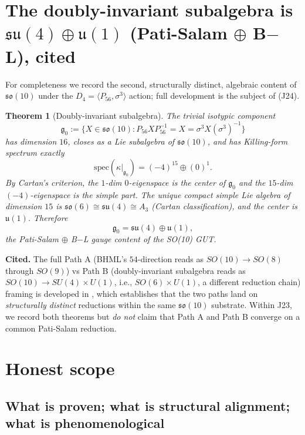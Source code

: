 \documentclass[11pt,reqno]{amsart}
\newtheorem{theorem}{Theorem}[section]
\theoremstyle{definition}
\newcommand{\so}{\mathfrak{so}}
\newcommand{\su}{\mathfrak{su}}
\newcommand{\uone}{\mathfrak{u}}
\newcommand{\Psix}{P_{56}}
\begin{document}
\section{The doubly-invariant subalgebra is $\su(4) \oplus \uone(1)$
(Pati-Salam $\oplus$ B$-$L), cited}
\label{sec:doubly-invariant}

For completeness we record the second, structurally distinct,
algebraic content of $\so(10)$ under the $D_4 = \langle \Psix,
\sigma^3 \rangle$ action; full development is the subject of
\cite{Sanders2026PathAPathB} (J24).

\begin{theorem}[Doubly-invariant subalgebra]
\label{thm:doubly-invariant}
The trivial isotypic component
\[
  \mathfrak{g}_0 := \{X \in \so(10) : \Psix X \Psix^{-1} = X
  = \sigma^3 X (\sigma^3)^{-1}\}
\]
has dimension $16$, closes as a Lie subalgebra of $\so(10)$, and
has Killing-form spectrum exactly
\[
  \mathrm{spec}(\kappa\big|_{\mathfrak{g}_0})
  = (-4)^{15} \oplus (0)^1.
\]
By Cartan's criterion, the $1$-dim $0$-eigenspace is the center of
$\mathfrak{g}_0$ and the $15$-dim $(-4)$-eigenspace is the simple
part. The unique compact simple Lie algebra of dimension $15$ is
$\so(6) \cong \su(4) \cong A_3$ (Cartan classification), and the
center is $\uone(1)$. Therefore
\[
  \mathfrak{g}_0 = \su(4) \oplus \uone(1),
\]
the Pati-Salam $\oplus$ B$-$L gauge content of the SO(10) GUT.
\end{theorem}

\noindent\textbf{Cited.} The full Path A (BHML's $54$-direction
reads as $SO(10) \to SO(8)$ through $SO(9)$) vs Path B
(doubly-invariant subalgebra reads as $SO(10) \to SU(4) \times U(1)$,
i.e., $SO(6) \times U(1)$, a different reduction chain) framing is
developed in \cite{Sanders2026PathAPathB}, which establishes that
the two paths land on \emph{structurally distinct} reductions
within the same $\so(10)$ substrate. Within J23, we record both
theorems but \emph{do not} claim that Path A and Path B converge on
a common Pati-Salam reduction.

\section{Honest scope}
\label{sec:scope}

\subsection{What is proven; what is structural alignment; what is
phenomenological}
\end{document}
